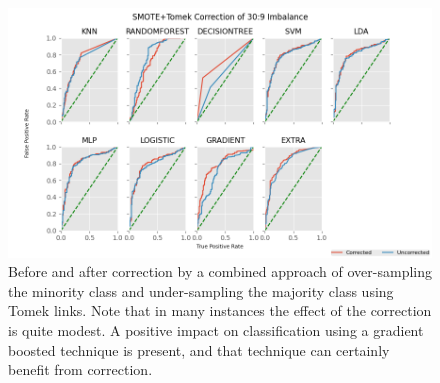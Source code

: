 \documentclass[letterpaper, notitlepage]{report}
\begin{document}
\begin{figure}[H]
	\centering
	\includegraphics[height=0.40\textheight]{figures/roc-corrected-tomek.png}
	\caption[Before and after correction]{Before and after correction by a combined approach of over-sampling the minority class and under-sampling the majority class using Tomek links. Note that in many instances the effect of the correction is quite modest. A positive impact on classification using a gradient boosted technique is present, and that technique can certainly benefit from correction. }
	\label{fig:auc-tomek}
\end{figure}
\end{document}

